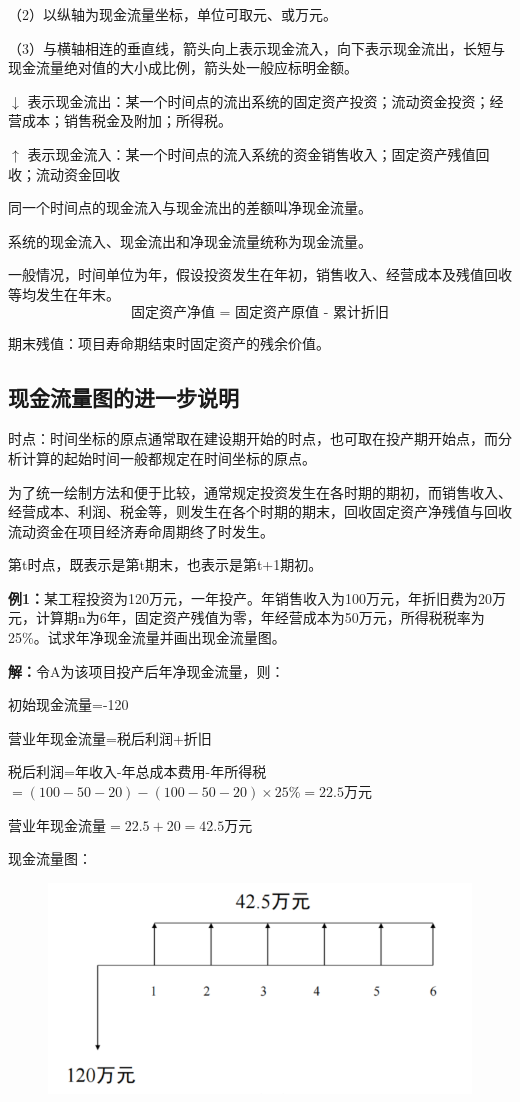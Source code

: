 （2）以纵轴为现金流量坐标，单位可取元、或万元。

（3）与横轴相连的垂直线，箭头向上表示现金流入，向下表示现金流出，长短与现金流量绝对值的大小成比例，箭头处一般应标明金额。

$\downarrow$ 表示现金流出：某一个时间点的流出系统的固定资产投资；流动资金投资；经营成本；销售税金及附加；所得税。

$\uparrow$ 表示现金流入：某一个时间点的流入系统的资金销售收入；固定资产残值回收；流动资金回收

同一个时间点的现金流入与现金流出的差额叫净现金流量。

系统的现金流入、现金流出和净现金流量统称为现金流量。

一般情况，时间单位为年，假设投资发生在年初，销售收入、经营成本及残值回收等均发生在年末。
$$
\mbox{固定资产净值 = 固定资产原值 - 累计折旧}
$$

期末残值：项目寿命期结束时固定资产的残余价值。

\subsection{现金流量图的进一步说明}
时点：时间坐标的原点通常取在建设期开始的时点，也可取在投产期开始点，而分析计算的起始时间一般都规定在时间坐标的原点。

为了统一绘制方法和便于比较，通常规定投资发生在各时期的期初，而销售收入、经营成本、利润、税金等，则发生在各个时期的期末，回收固定资产净残值与回收流动资金在项目经济寿命周期终了时发生。

第t时点，既表示是第t期末，也表示是第t+1期初。

\textbf{例1：}某工程投资为120万元，一年投产。年销售收入为100万元，年折旧费为20万元，计算期n为6年，固定资产残值为零，年经营成本为50万元，所得税税率为25\%。试求年净现金流量并画出现金流量图。

\textbf{解：}令A为该项目投产后年净现金流量，则：

初始现金流量=-120

营业年现金流量=税后利润+折旧

税后利润=年收入-年总成本费用-年所得税$=(100-50-20)-(100-50-20) \times 25\%=22.5$万元

营业年现金流量$=22.5+20=42.5$万元

现金流量图：
\begin{figure}[H]
    \centering
    \includegraphics[width=0.75\linewidth]{image/现金流量图-例题.png}
\end{figure}

